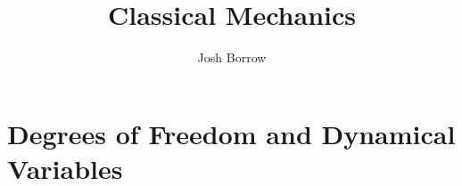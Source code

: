\documentclass[11pt]{report}
\begin{document}
\title{Classical Mechanics}
\author{Josh Borrow}

\maketitle

\chapter{Degrees of Freedom and Dynamical Variables}


\end{document}
